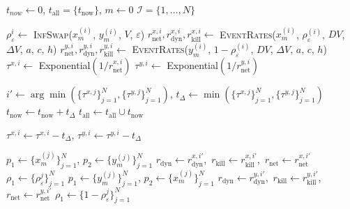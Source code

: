 \documentclass[english,11pt]{article}%
\numberwithin{equation}{section}
\numberwithin{example}{section}
\numberwithin{theorem}{section}
\begin{document}
\begin{algorithm}
\caption{Backward-Forward Infinite Swapping Fleming-Viot}
\begin{algorithmic}[1]

\State $t_{now} \gets 0$, $t_{\text{all}} = \{t_{\text{now} }\}$,  $m \gets 0$
\State $\mathcal{I} = \{1,\ldots, N \}$



    \State $\rho_\varepsilon^i \gets$ \textsc{InfSwap}($x_m^{(i)}$, $y_m^{(i)}$, $V$, $\varepsilon$)
    \State $r^{x,i}_{\text{net}}, r^{x,i}_{\text{dyn}}, r^{x,i}_{\text{kill}}\gets$ \textsc{EventRates}($x^{(i)}_m$, $\rho_\varepsilon^{(i)}$, $DV$, $\Delta V$, $a$, $c$, $h$)
    \State $r^{y,i}_{\text{net}}, r^{y,i}_{\text{dyn}}, r^{y,i}_{\text{kill}}\gets$ \textsc{EventRates}($y^{(i)}_m$, $1-\rho_\varepsilon^{(i)}$, $DV$, $\Delta V$, $a$, $c$, $h$)
    \State $\tau^{x,i} \gets$ Exponential$(1/r^{x,i}_{\text{net}})$
    \State $\tau^{y,i} \gets$ Exponential$(1/r^{y,i}_{\text{net}})$
\EndFor

    \State $i' \gets \arg\min(\{\tau^{x,j}\}_{j = 1}^N, \{\tau^{y,j}\}_{j = 1}^N)$,  $t_\Delta \gets \min(\{\tau^{x,j}\}_{j = 1}^N, \{\tau^{y,j}\}_{j = 1}^N)$
    \State $t_{\text{now}} \gets t_{\text{now}} + t_\Delta$
    \State $t_{\text{all}} \gets t_{\text{all}} \cup t_{\text{now}} $
    
        \State $\tau^{x,i} \gets \tau^{x,i} - t_\Delta$, $\tau^{y,i} \gets \tau^{y,i} - t_\Delta$
    \EndFor

        \State $p_1 \gets \{x_{m}^{(j)}\}_{j = 1}^N$, $p_2 \gets \{y_{m}^{(j)}\}_{j = 1}^N$
        \State $r_{\text{dyn}} \gets r_{\text{dyn}}^{x,i'}$,\, $r_{\text{kill}} \gets r_{\text{kill}}^{x,i'}$,\, $r_{\text{net}} \gets r^{x,i'}_{\text{net}}$
        \State $\rho_1 \gets \{\rho_\varepsilon^{j}\}_{j = 1}^N$
    \Else
        \State $p_1 \gets \{y_{m}^{(j)}\}_{j = 1}^N$, $p_2 \gets \{x_{m}^{(j)}\}_{j = 1}^N$
        \State $r_{\text{dyn}} \gets r_{\text{dyn}}^{y,i'}$,\, $r_{\text{kill}} \gets r_{\text{kill}}^{y,i'}$,\, $r_{\text{net}} \gets r^{y,i'}_{\text{net}}$
        \State $\rho_1 \gets \{1-\rho_\varepsilon^{j}\}_{j = 1}^N$
    \EndIf


\end{algorithmic}
\end{algorithm}
\end{document}
